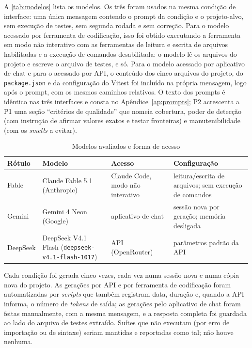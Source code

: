 A \autoref{tab:modelos} lista os modelos. Os três foram usados na mesma condição de interface: uma única mensagem contendo o prompt da condição e o projeto-alvo, sem execução de testes, sem segunda rodada e sem correção. Para o modelo acessado por ferramenta de codificação, isso foi obtido executando a ferramenta em modo não interativo com as ferramentas de leitura e escrita de arquivos habilitadas e a execução de comandos desabilitada: o modelo lê os arquivos do projeto e escreve o arquivo de testes, e só. Para o modelo acessado por aplicativo de chat e para o acessado por API, o conteúdo dos cinco arquivos do projeto, do \texttt{package.json} e da configuração do Vitest foi incluído na própria mensagem, logo após o prompt, com os mesmos caminhos relativos. O texto dos prompts é idêntico nas três interfaces e consta no Apêndice~\ref{ap:prompts}; P2 acrescenta a P1 uma seção ``critérios de qualidade'' que nomeia cobertura, poder de detecção (com instrução de afirmar valores exatos e testar fronteiras) e manutenibilidade (com os \textit{smells} a evitar).

\begin{table}[htb]
    \centering
    \ABNTEXfontereduzida
    \begin{minipage}{\textwidth}
        \caption{Modelos avaliados e forma de acesso}
        \label{tab:modelos}
        \centering
        \begin{tabular}{p{1.6cm}p{5.2cm}p{3.6cm}p{4.4cm}}
            \toprule
            \textbf{Rótulo} & \textbf{Modelo} & \textbf{Acesso} & \textbf{Configuração} \\
            \midrule
            Fable & Claude Fable 5.1 (Anthropic) & Claude Code, modo não interativo & leitura/escrita de arquivos; sem execução de comandos \\
            Gemini & Gemini 4 Neon (Google) & aplicativo de chat & sessão nova por geração; memória desligada \\
            DeepSeek & DeepSeek V4.1 Flash (\texttt{deepseek-v4.1-flash-1017}) & API (OpenRouter) & parâmetros padrão da API \\
            \bottomrule
        \end{tabular}
    \end{minipage}
\end{table}

Cada condição foi gerada cinco vezes, cada vez numa sessão nova e numa cópia nova do projeto. As gerações por API e por ferramenta de codificação foram automatizadas por \textit{scripts} que também registram data, duração e, quando a API informa, o número de \textit{tokens} de saída; as gerações pelo aplicativo de chat foram feitas manualmente, com a mesma mensagem, e a resposta completa foi guardada ao lado do arquivo de testes extraído. Suítes que não executam (por erro de importação ou de sintaxe) seriam mantidas e reportadas como tal; não houve nenhuma.


